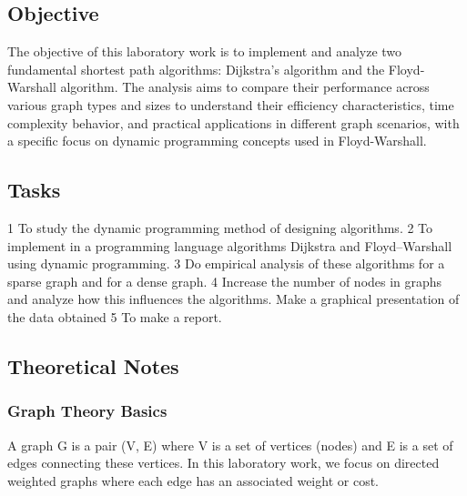 \documentclass[a4paper,12pt]{article}
\begin{document}
\subsection{Objective}
\label{sec:org707d353}
The objective of this laboratory work is to implement and analyze two fundamental shortest path algorithms: Dijkstra's algorithm and the Floyd-Warshall algorithm. The analysis aims to compare their performance across various graph types and sizes to understand their efficiency characteristics, time complexity behavior, and practical applications in different graph scenarios, with a specific focus on dynamic programming concepts used in Floyd-Warshall.
\subsection{Tasks}
\label{sec:org4c56525}
1 To study the dynamic programming method of designing algorithms.
2 To implement in a programming language algorithms Dijkstra and Floyd–Warshall using dynamic programming.
3 Do empirical analysis of these algorithms for a sparse graph and for a dense graph.
4 Increase the number of nodes in graphs and analyze how this influences the algorithms. Make a graphical presentation of the data obtained
5 To make a report.
\subsection{Theoretical Notes}
\label{sec:org20dae87}
\subsubsection{Graph Theory Basics}
\label{sec:org16f1dc1}
A graph G is a pair (V, E) where V is a set of vertices (nodes) and E is a set of edges connecting these vertices. In this laboratory work, we focus on directed weighted graphs where each edge has an associated weight or cost.
\end{document}
